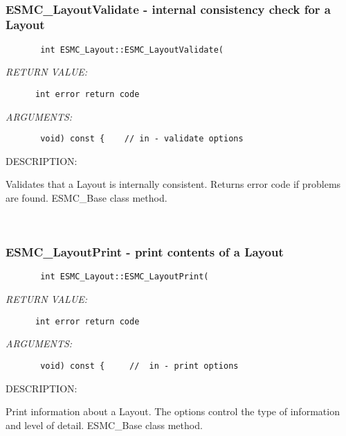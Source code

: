  
\mbox{}\hrulefill\ 
 
\subsubsection{ESMC\_LayoutValidate - internal consistency check for a Layout}


  
\begin{verbatim}       int ESMC_Layout::ESMC_LayoutValidate(\end{verbatim}{\em RETURN VALUE:}
\begin{verbatim}      int error return code\end{verbatim}{\em ARGUMENTS:}
\begin{verbatim}       void) const {    // in - validate options\end{verbatim}
{\sf DESCRIPTION:\\ }


        Validates that a Layout is internally consistent.
        Returns error code if problems are found.  ESMC\_Base class method.
   
 
\mbox{}\hrulefill\ 
 
\subsubsection{ESMC\_LayoutPrint - print contents of a Layout}


  
\begin{verbatim}       int ESMC_Layout::ESMC_LayoutPrint(\end{verbatim}{\em RETURN VALUE:}
\begin{verbatim}      int error return code\end{verbatim}{\em ARGUMENTS:}
\begin{verbatim}       void) const {     //  in - print options\end{verbatim}
{\sf DESCRIPTION:\\ }


        Print information about a Layout.  The options control the
        type of information and level of detail.  ESMC\_Base class method.
   
 
